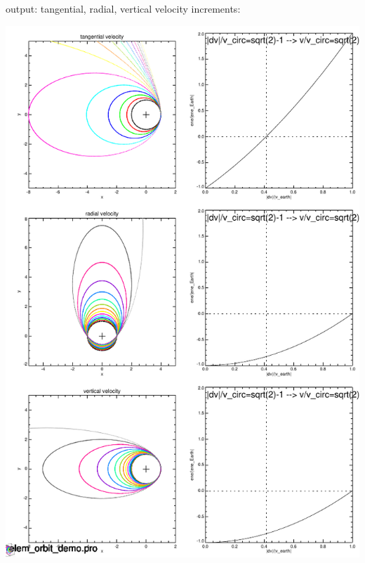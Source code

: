 \documentclass[a4paper,12pt]{article}
\def\black{\color{RGBblack}}
\begin{document}
{{{{\begin{verbatim}
\end{verbatim}
\black}
\small

\newpage

{\medb output:  tangential, radial, vertical velocity increments:}

\vspace{-9cm}
\includegraphics[height=1.4\paperwidth]{demo_apu.pdf}


\newpage





}}}
\end{document}
